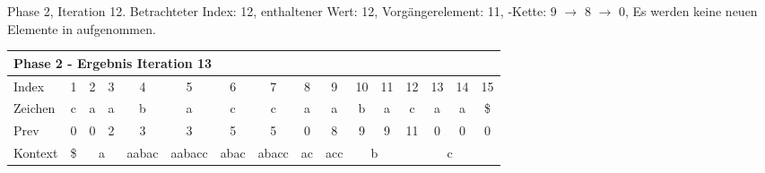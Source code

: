 \begin{table}[H]
\caption[Phase 2, Iteration 12]{Phase 2, Iteration 12. Betrachteter Index: 12, enthaltener Wert: 12, Vorgängerelement: 11, \prevpointer-Kette: 9 $\rightarrow$ 8 $\rightarrow$ 0, Es werden keine neuen Elemente in \sa aufgenommen.}
\label{table_complex_example_2_12} 
\end{table}

\begin{table}[H]
\centering
\begin{adjustbox}{max width=\textwidth}
\centering
\begin{tabular}{lccccccccccccccc}
\multicolumn{16}{l}{Phase 2 - Ergebnis Iteration 13}                                                                                                                                                                                                                                                                                                            \\ \hline
\multicolumn{1}{l|}{Index}   & 1                       & 2  & 3                       & 4                          & 5                           & 6                         & 7                          & 8                       & 9                        & 10 & 11                      & 12 & 13                        & 14 & 15                        \\
\multicolumn{1}{l|}{Zeichen} & c                       & a  & a                       & b                          & a                           & c                         & c                          & a                       & a                        & b  & a                       & c  & a                         & a  & \$                        \\
\multicolumn{1}{l|}{Prev}    & 0                       & 0  & 2                       & 3                          & 3                           & 5                         & 5                          & 0                       & 8                        & 9  & 9                       & 11 & 0                         & 0  & 0                         \\ \hline
\multicolumn{1}{l|}{Kontext} & \multicolumn{1}{c|}{\$} & \multicolumn{2}{c|}{a}       & \multicolumn{1}{c|}{aabac} & \multicolumn{1}{c|}{aabacc} & \multicolumn{1}{c|}{abac} & \multicolumn{1}{c|}{abacc} & \multicolumn{1}{c|}{ac} & \multicolumn{1}{c|}{acc} & \multicolumn{2}{c|}{b}       & \multicolumn{4}{c}{c}                                           \\

\end{tabular}
\end{adjustbox}
\end{table}
